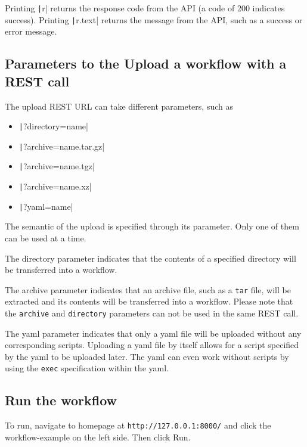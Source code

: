 Printing \texttt|r| returns the response code from the API (a code of
200 indicates success). Printing \texttt|r.text| returns the message
from the API, such as a success or error message.

\subsection{Parameters to the Upload a workflow with a REST
call}\label{parameters-to-the-upload-a-workflow-with-a-rest-call}

The upload REST URL can take different parameters, such as

\begin{itemize}
\item
  \texttt|?directory=name|
\item
  \texttt|?archive=name.tar.gz|
\item
  \texttt|?archive=name.tgz|
\item
  \texttt|?archive=name.xz|
\item
  \texttt|?yaml=name|
\end{itemize}

The semantic of the upload is specified through its parameter. Only one
of them can be used at a time.

The directory parameter indicates that the contents of a specified
directory will be transferred into a workflow.

The archive parameter indicates that an archive file, such as a
\texttt{tar} file, will be extracted and its contents will be
transferred into a workflow. Please note that the \texttt{archive} and
\texttt{directory} parameters can not be used in the same REST call.

The yaml parameter indicates that only a yaml file will be uploaded
without any corresponding scripts. Uploading a yaml file by itself
allows for a script specified by the yaml to be uploaded later. The yaml
can even work without scripts by using the \texttt{exec} specification
within the yaml.

\subsection{Run the workflow}\label{run-the-workflow}

To run, navigate to homepage at \texttt{http://127.0.0.1:8000/} and
click the workflow-example on the left side. Then click Run.
